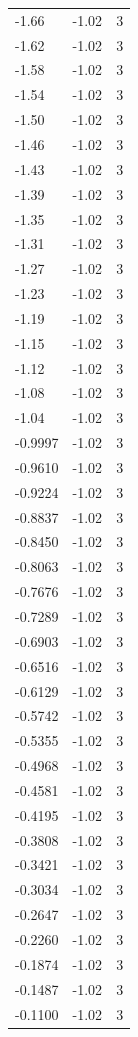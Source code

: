 \begin{longtable}{lrr}
  -1.66 & -1.02 & 3 \\
  -1.62 & -1.02 & 3 \\
  -1.58 & -1.02 & 3 \\
  -1.54 & -1.02 & 3 \\
  -1.50 & -1.02 & 3 \\
  -1.46 & -1.02 & 3 \\
  -1.43 & -1.02 & 3 \\
  -1.39 & -1.02 & 3 \\
  -1.35 & -1.02 & 3 \\
  -1.31 & -1.02 & 3 \\
  -1.27 & -1.02 & 3 \\
  -1.23 & -1.02 & 3 \\
  -1.19 & -1.02 & 3 \\
  -1.15 & -1.02 & 3 \\
  -1.12 & -1.02 & 3 \\
  -1.08 & -1.02 & 3 \\
  -1.04 & -1.02 & 3 \\
  -0.9997 & -1.02 & 3 \\
  -0.9610 & -1.02 & 3 \\
  -0.9224 & -1.02 & 3 \\
  -0.8837 & -1.02 & 3 \\
  -0.8450 & -1.02 & 3 \\
  -0.8063 & -1.02 & 3 \\
  -0.7676 & -1.02 & 3 \\
  -0.7289 & -1.02 & 3 \\
  -0.6903 & -1.02 & 3 \\
  -0.6516 & -1.02 & 3 \\
  -0.6129 & -1.02 & 3 \\
  -0.5742 & -1.02 & 3 \\
  -0.5355 & -1.02 & 3 \\
  -0.4968 & -1.02 & 3 \\
  -0.4581 & -1.02 & 3 \\
  -0.4195 & -1.02 & 3 \\
  -0.3808 & -1.02 & 3 \\
  -0.3421 & -1.02 & 3 \\
  -0.3034 & -1.02 & 3 \\
  -0.2647 & -1.02 & 3 \\
  -0.2260 & -1.02 & 3 \\
  -0.1874 & -1.02 & 3 \\
  -0.1487 & -1.02 & 3 \\
  -0.1100 & -1.02 & 3 \\

\end{longtable}
